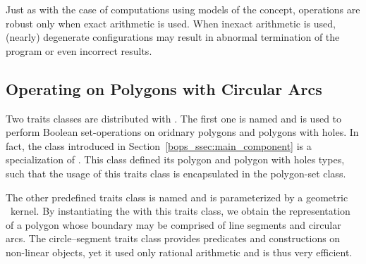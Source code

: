 Just as with the case of computations using models of the 
 concept, operations are robust only
when exact arithmetic is used. When inexact arithmetic is used,
(nearly) degenerate configurations may result in abnormal termination
of the program or even incorrect results.

\subsection{Operating on Polygons with Circular Arcs}
\label{bso_ssec:circ_seg}

Two traits classes are distributed with \cgal. The first one is named
 and is used to perform Boolean set-operations
on oridnary polygons and polygons with holes. In fact, the class
 introduced in Section~\ref{bops_ssec:main_component}
is a specialization of .
This class defined its polygon and polygon with holes types, such that
the usage of this traits class is encapsulated in the polygon-set class.

The other predefined traits class is named
 and is parameterized by a
geometric \cgal\ kernel. By instantiating the 
with this traits class, we obtain the representation of a polygon whose
boundary may be comprised of line segments and circular arcs.
The circle--segment traits class provides predicates and constructions on
non-linear objects, yet it used only rational arithmetic and is thus
very efficient.

